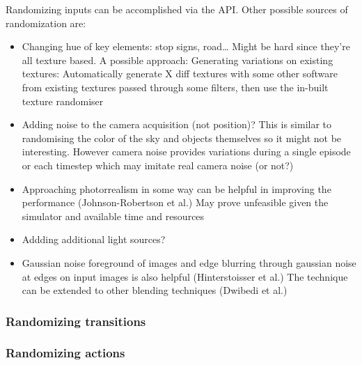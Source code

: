 \documentclass[12pt]{article}
\begin{document}
Randomizing inputs can be accomplished via the API. Other possible sources of randomization are:
\begin{itemize}
    \item Changing hue of key elements: stop signs, road… Might be hard since they’re all texture based. A possible approach: Generating variations on existing textures: Automatically generate X diff textures with some other software from existing textures passed through some filters, then use the in-built texture randomiser
    \item Adding noise to the camera acquisition (not position)? This is similar to randomising the color of the sky and objects themselves so it might not be interesting. However camera noise provides variations during a single episode or each timestep which may imitate real camera noise (or not?)
    \item Approaching photorrealism in some way can be helpful in improving the performance (Johnson-Robertson et al.) May prove unfeasible given the simulator and available time and resources
    \item Addding additional light sources?
    \item Gaussian noise foreground of images and edge blurring through gaussian noise at edges on input images is also helpful (Hinterstoisser et al.) The technique can be extended to other blending techniques (Dwibedi et al.)
\end{itemize}
\subsubsection{Randomizing transitions}
\subsubsection{Randomizing actions}
\end{document}

